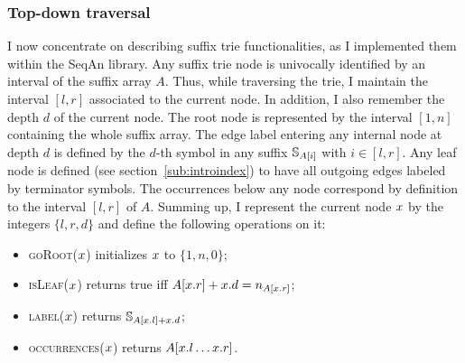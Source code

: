 \subsubsection{Top-down traversal}

I now concentrate on describing suffix trie functionalities, as I implemented them within the SeqAn library.
Any suffix trie node is univocally identified by an interval of the suffix array $A$.
Thus, while traversing the trie, I maintain the interval $[l,r]$ associated to the current node.
In addition, I also remember the depth $d$ of the current node.
The root node is represented by the interval $[1,n]$ containing the whole suffix array.
The edge label entering any internal node at depth $d$ is defined by the $d$-th symbol in any suffix $\mathbb {S}_{A[i]}$ with $i \in [l,r]$.
Any leaf node is defined (see section~\ref{sub:introindex}) to have all outgoing edges labeled by terminator symbols.
The occurrences below any node correspond by definition to the interval $[l,r]$ of $A$.
Summing up, I represent the current node $x$ by the integers $\{ l, r ,d \}$ and define the following operations on it:
\begin{itemize}
\item \textsc{goRoot}($x$) initializes $x$ to $\{ 1, n, 0\}$;
\item \textsc{isLeaf}($x$) returns true iff $A[x.r] + x.d = n_{A[x.r]}$;
\item \textsc{label}($x$) returns $\mathbb {S}_{A[x.l] + x.d}$;
\item \textsc{occurrences}($x$) returns $A[x.l \dots x.r]$.
\end{itemize}

